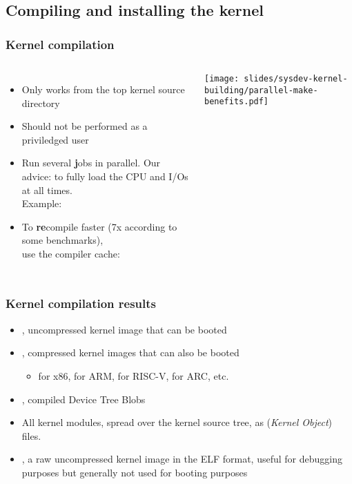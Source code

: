 \subsection{Compiling and installing the kernel}

\begin{frame}[fragile]
  \frametitle{Kernel compilation}
  \begin{columns}[T]
  \begin{itemize}
    \item Only works from the top kernel source directory
    \item Should not be performed as a priviledged user
    \item Run several {\bf j}obs in parallel. Our advice:  to
      fully load the CPU and I/Os at all times.\\
          Example: 
    \item To {\bf re}compile faster (7x according to some benchmarks),\\
	  use the  compiler cache:\\
  \end{itemize}
    \texttt{[image: slides/sysdev-kernel-building/parallel-make-benefits.pdf]}
  \end{columns}
\end{frame}

\begin{frame}
  \frametitle{Kernel compilation results}
  \begin{itemize}
    \item {}, uncompressed kernel image that
      can be booted
    \item {}, compressed kernel images that
      can also be booted
      \begin{itemize}
      \item {} for x86,  for ARM,
       for RISC-V,  for ARC, etc.
      \end{itemize}
    \item {}, compiled Device Tree Blobs
    \item All kernel modules, spread over the kernel source tree, as
       ({\em Kernel Object}) files.
    \item {}, a raw uncompressed kernel image in the ELF
      format, useful for debugging purposes but generally not used for
      booting purposes
  \end{itemize}
\end{frame}

